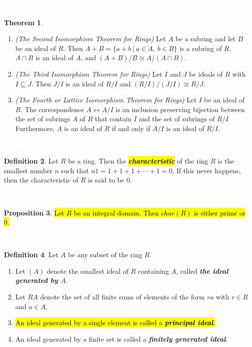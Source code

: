 \documentclass{article}
\theoremstyle{definition}
\newtheorem{thm}{Theorem}[section]
\newtheorem{prop}[thm]{Proposition}
\newtheorem{defn}[thm]{Definition}
\newcommand{\nl}{\textcolor{white}{nothing}}
\newcommand{\seq}{\subseteq}
\begin{document}
\nl

\begin{thm}\nl
\begin{enumerate}
\item \textit{(The Second Isomorphism Theorem for Rings)} Let $A$ be a subring and let $B$ be an ideal of $R$. Then $A+B = \{a + b\ |\ a\in A, \ b\in B\}$ is a subring of $R$, $A\cap B$ is an ideal of $A$, and $(A+B)/B\cong A/(A\cap B)$.
\item \textit{(The Third Isomorphism Theorem for Rings)} Let $I$ and $J$ be ideals of $R$ with $I\seq J$. Then $J/I$ is an ideal of $R/I$ and $(R/I)/(J/I)\cong R/J$.
\item \textit{(The Fourth or Lattice Isomorphism Theorem for Rings)} Let $I$ be an ideal of $R$. The correspondence $A\leftrightarrow A/I$ is an inclusion preserving bijection between the set of subrings $A$ of $R$ that contain $I$ and the set of subrings of $R/I$ Furthermore, $A$ is an ideal of $R$ if and only if $A/I$ is an ideal of $R/I$.
\end{enumerate}
\end{thm}

\nl

\begin{defn}
Let $R$ be a ring. Then the \hl{\textit{\textbf{characteristic}}} of the ring $R$ is the smallest number $n$ such that $n1 = 1+1+1+\cdots+1 = 0$. If this never happens, then the characteristic of $R$ is said to be $0$.
\end{defn}

\nl

\begin{prop}
\hl{Let $R$ be an integral domain. Then $char(R)$ is either prime or 0.}
\end{prop}

\nl

\begin{defn}
Let $A$ be any subset of the ring $R$.
\begin{enumerate}
\item Let $(A)$ denote the smallest ideal of $R$ containing $A$, called \textbf{\textit{the ideal generated by $A$}}.
\item Let $RA$ denote the set of all finite sums of elements of the form $ra$ with $r\in R$ and $a\in A$.
\item \hl{An ideal generated by a single element is called a \textit{\textbf{principal ideal}}.}
\item An ideal generated by a finite set is called a \textbf{\textit{finitely generated ideal}}.
\end{enumerate}
\end{defn}
\end{document}
